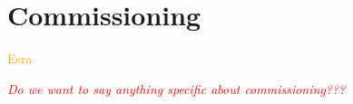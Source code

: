 \section{\label{sec:commiss} Commissioning}
\textcolor{orange}{Esra}
\medskip

\textcolor{red}{\textit{Do we want to say anything specific about commissioning???}}
